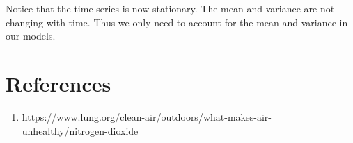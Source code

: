 \documentclass[a4paper, 10pt]{article}
\begin{document}
\begin{flushleft}
      Notice that the time series is now stationary. The mean and variance are not changing with time. Thus we only need to account for the mean and variance in our models.
   
   \section*{References}
      \begin{enumerate}
         \item https://www.lung.org/clean-air/outdoors/what-makes-air-unhealthy/nitrogen-dioxide
      \end{enumerate}
   
   \end{flushleft}
\end{document}
